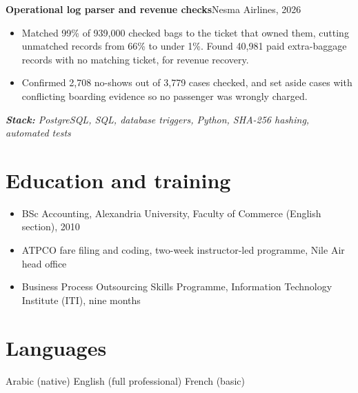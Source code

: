 \documentclass[10pt,a4paper]{article}
\newcommand{\project}[2]{\vspace{4pt}\needspace{3\baselineskip}\textbf{#1}\hfill{\small\color{muted}#2}\par}
\newcommand{\stack}[1]{{\small\itshape\color{muted}\hspace{1.1em}\textbf{Stack:} #1}\par}
\begin{document}
\project{Operational log parser and revenue checks}{Nesma Airlines, 2026}
\begin{itemize}
  \item Matched 99\% of 939,000 checked bags to the ticket that owned them, cutting unmatched records from 66\% to under 1\%. Found 40,981 paid extra-baggage records with no matching ticket, for revenue recovery.
  \item Confirmed 2,708 no-shows out of 3,779 cases checked, and set aside cases with conflicting boarding evidence so no passenger was wrongly charged.
\end{itemize}
\stack{PostgreSQL, SQL, database triggers, Python, SHA-256 hashing, automated tests}

\section{Education and training}
\begin{itemize}
  \item BSc Accounting, Alexandria University, Faculty of Commerce (English section), 2010
  \item ATPCO fare filing and coding, two-week instructor-led programme, Nile Air head office
  \item Business Process Outsourcing Skills Programme, Information Technology Institute (ITI), nine months
\end{itemize}

\section{Languages}
Arabic (native)  \textperiodcentered{}  English (full professional)  \textperiodcentered{}  French (basic)\par
\end{document}
